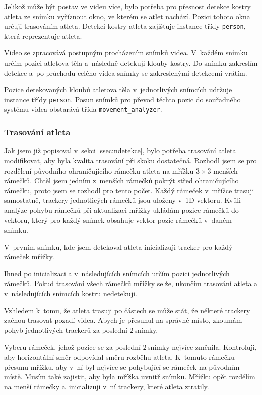 Jelikož může být postav ve videu více, bylo potřeba pro přesnost detekce kostry atleta ze snímku vyříznout okno, ve kterém se atlet nachází. Pozici tohoto okna určuji trasováním atleta. Detekci kostry atleta zajišťuje instance třídy \texttt{person}, která reprezentuje atleta.

Video se zpracovává postupným procházením snímků videa. V~každém snímku určím pozici atletova těla a~následně detekuji klouby kostry. Do snímku zakreslím detekce a~po průchodu celého videa snímky se zakreslenými detekcemi vrátím.

Pozice detekovaných kloubů atletova těla v~jednotlivých snímcích udržuje instance třídy \texttt{person}. Posun snímků pro převod těchto pozic do souřadného systému videa obstarává třída \texttt{movement\_analyzer}.


\subsubsection{Trasování atleta}

Jak jsem již popisoval v~sekci \ref{ssec:ndetekce}, bylo potřeba trasování atleta modifikovat, aby byla kvalita trasování při skoku dostatečná. Rozhodl jsem se pro rozdělení původního ohraničujícího rámečku atleta na mřížku $3\times 3$ menších rámečků. Chtěl jsem jedním z~menších rámečků pokrýt střed ohraničujícího rámečku, proto jsem se rozhodl pro tento počet. Každý rámeček v~mřížce trasuji samostatně, trackery jednotlicých rámečků jsou uloženy v~1D vektoru. Kvůli analýze pohybu rámečků při aktualizaci mřížky ukládám pozice rámečků do vektoru, který pro každý snímek obsahuje vektor pozic rámečků v~daném snímku.

V~prvním snímku, kde jsem detekoval atleta inicializuji tracker pro každý rámeček mřížky.

Ihned po inicializaci a v~následujících snímcích určím pozici jednotlivých rámečků. Pokud trasování všech rámečků mřížky selže, ukončím trasování atleta a v~následujících snímcích kostru nedetekuji.

Vzhledem k~tomu, že atleta trasuji po částech se může stát, že některé trackery začnou trasovat pozadí videa. Abych je přesunul na správné místo, zkoumám pohyb jednotlivých trackerů za poslední $2$\,\rm snímky.

Vyberu rámeček, jehož pozice se za poslední $2$\,\rm snímky nejvíce změnila. Kontroluji, aby horizontální směr odpovídal směru rozběhu atleta. K~tomuto rámečku přesunu mřížku, aby v~ní byl nejvíce se pohybující se rámeček na původním místě. Musím také zajistit, aby byla mřížka uvnitř snímku. Mřížku opět rozdělím na menší rámečky a~inicializuji v~ní trackery, které atleta ztratily.

